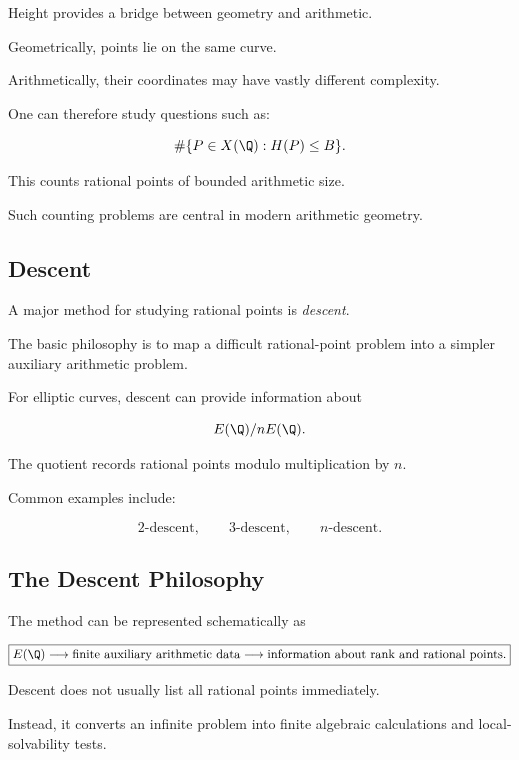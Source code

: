 Height provides a bridge between geometry and arithmetic.

Geometrically, points lie on the same curve.

Arithmetically, their coordinates may have vastly different complexity.

One can therefore study questions such as:

\[ \#\{P\in X(\Q):H(P)\leq B\}. \]

This counts rational points of bounded arithmetic size.

Such counting problems are central in modern arithmetic geometry.

\subsection{Descent}
\label{subsec:descent-arithmetic-geometry}

A major method for studying rational points is \emph{descent}.

The basic philosophy is to map a difficult rational-point problem into a
simpler auxiliary arithmetic problem.

For elliptic curves, descent can provide information about

\[ E(\Q)/nE(\Q). \]

The quotient records rational points modulo multiplication by \(n\).

Common examples include:

\[
2\text{-descent},\qquad
3\text{-descent},\qquad
n\text{-descent}.
\]

\subsection{The Descent Philosophy}
\label{subsec:descent-philosophy}

The method can be represented schematically as

\[
\boxed{
E(\Q)
\longrightarrow
\text{finite auxiliary arithmetic data}
\longrightarrow
\text{information about rank and rational points}.
}
\]

Descent does not usually list all rational points immediately.

Instead, it converts an infinite problem into finite algebraic calculations
and local-solvability tests.


